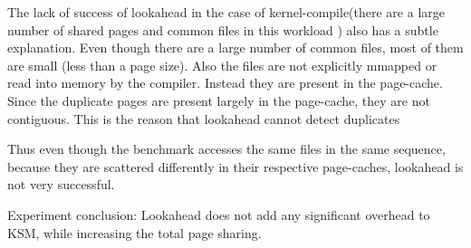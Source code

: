 \documentclass[10pt,a4paper]{article}
\begin{document}
The lack of success of lookahead in the case of kernel-compile(there are a large number of shared pages and common files in this workload ) also has a subtle explanation. 
Even though there are a large number of common files, most of them are small (less than a page size). Also the files are not explicitly mmapped or read into memory by the compiler. Instead they are present in the page-cache. Since the duplicate pages are present largely in the page-cache, they are not contiguous. This is the reason that lookahead cannot detect duplicates 

Thus even though the benchmark accesses the same files in the same sequence, because they are scattered differently in their respective page-caches, lookahead is not very successful.

Experiment conclusion:
Lookahead does not add any significant overhead to KSM, while increasing the total page sharing.






\end{document}
